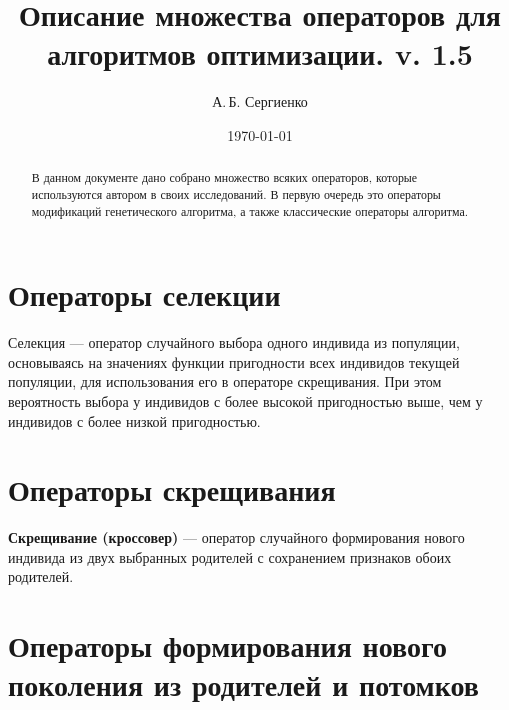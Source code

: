 \documentclass[a4paper,12pt]{article}
\title{Описание множества операторов для алгоритмов оптимизации. v. 1.5}
\author{А.\,Б. Сергиенко}
\date{\today}
\begin{document}


\maketitle

\begin{abstract}
В данном документе дано собрано множество всяких операторов, которые используются автором в своих исследований. В первую очередь это операторы модификаций генетического алгоритма, а также классические операторы алгоритма.
\end{abstract}

\tableofcontents

\newpage




\section{Операторы селекции}\label{SetOfOperatorsAlgorithms:section_selection}

Селекция --- оператор случайного выбора одного индивида из популяции, основываясь на значениях функции пригодности всех индивидов текущей популяции, для использования его в операторе скрещивания. При этом вероятность выбора у индивидов с более высокой пригодностью выше, чем у индивидов с более низкой пригодностью.






\section{Операторы скрещивания}\label{SetOfOperatorsAlgorithms:section_Crossover}

\textbf{Скрещивание (кроссовер)} --- оператор случайного формирования нового индивида из двух выбранных родителей с сохранением признаков обоих родителей.










\section{Операторы формирования нового поколения из родителей и потомков}\label{SetOfOperatorsAlgorithms:section_forming}
\end{document}
